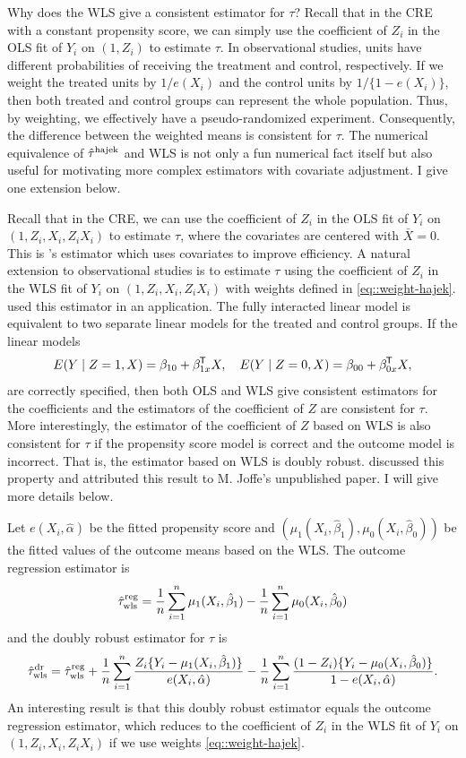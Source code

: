 Why does the WLS give a consistent estimator for $\tau$? Recall that in the CRE with a constant propensity score, we can simply use the coefficient of $Z_i$ in the OLS fit of $Y_i$ on $(1,Z_i)$ to estimate $\tau$. In observational studies, units have different probabilities of receiving the treatment and control, respectively. If we weight the treated units by $1/e(X_i)$ and the control units by $1/\{ 1-e(X_i)\}$, then both treated and control groups can represent the whole population. Thus, by weighting, we effectively have a pseudo-randomized experiment. Consequently, the difference between the weighted means is consistent for $\tau$. The numerical equivalence of $\hat{\tau}^\textup{hajek}$ and WLS is not only a fun numerical fact itself but also useful for motivating more complex estimators with covariate adjustment. I give one extension below.


Recall that in the CRE, we can use the coefficient of $Z_i$ in the OLS fit of $Y_i$ on $(1,Z_i, X_i, Z_iX_i)$ to estimate $\tau$, where the covariates are centered with $\bar{X} = 0$. This is \citet{lin2013}'s estimator which uses covariates to improve efficiency. A natural extension to observational studies is to estimate $\tau$ using the coefficient of $Z_i$ in the WLS fit of $Y_i$ on $(1,Z_i, X_i, Z_iX_i)$ with weights defined in \eqref{eq::weight-hajek}. \citet{hirano2001estimation} used this estimator in an application.
The fully interacted linear model is equivalent to two separate linear models for the treated and control groups. 
If the linear models
$$
E(Y\mid Z=1, X) = \beta_{10} +  \beta_{1x}^{\mkern-1.5mu\mathsf{T}} X,\quad
E(Y\mid Z=0, X) = \beta_{00} +  \beta_{0x}^{\mkern-1.5mu\mathsf{T}} X,
$$
are correctly specified, then both OLS and WLS give consistent estimators for the coefficients and the estimators of the coefficient of $Z$ are consistent for $\tau$. More interestingly, the estimator of the coefficient of $Z$ based on WLS is also consistent for $\tau$ if the propensity score model is correct and the outcome model is incorrect. That is, the estimator based on WLS is doubly robust. \citet{robins2007comment} discussed this property and attributed this result to M. Joffe's unpublished paper. I will give more details below. 



Let $e(X_i, \hat{\alpha})$ be the fitted propensity score and $( \mu_1(X_i, \hat{\beta}_1),  \mu_0(X_i, \hat{\beta}_0)) $ be the fitted values of the outcome means based on the WLS. The outcome regression estimator is 
$$
\hat{\tau}^\text{reg}_\text{wls} = \frac{1}{n} \sum_{i=1}^n \mu_1(X_i, \hat{\beta}_1) - \frac{1}{n} \sum_{i=1}^n \mu_0(X_i, \hat{\beta}_0)
$$
and the doubly robust estimator for $\tau$ is 
$$
\hat{\tau}^\text{dr}_\text{wls}  = 
\hat{\tau}^\text{reg}_\text{wls}  + \frac{1}{n} \sum_{i=1}^n  \frac{Z_i \{ Y_i- \mu_1(X_i, \hat{\beta}_1)\}  }{  e(X_i, \hat{\alpha}) } 
- \frac{1}{n} \sum_{i=1}^n  \frac{(1-Z_i) \{ Y_i- \mu_0(X_i, \hat{\beta}_0)\}  }{  1- e(X_i, \hat{\alpha}) }   .
$$
An interesting result is that this doubly robust estimator equals the outcome regression estimator, which reduces to the coefficient of $Z_i$ in the WLS fit of $Y_i$ on $(1,Z_i, X_i, Z_iX_i)$ if we use weights \eqref{eq::weight-hajek}. 




